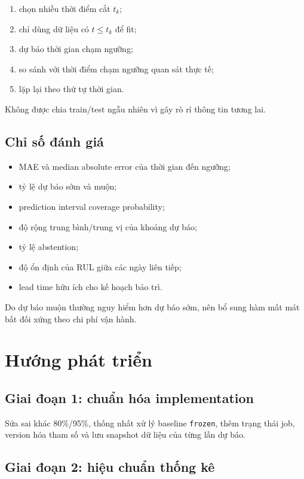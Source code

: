 \documentclass[12pt,a4paper]{article}
\newcommand{\code}[1]{\texttt{#1}}
\begin{document}
\begin{enumerate}
  \item chọn nhiều thời điểm cắt $t_k$;
  \item chỉ dùng dữ liệu có $t\le t_k$ để fit;
  \item dự báo thời gian chạm ngưỡng;
  \item so sánh với thời điểm chạm ngưỡng quan sát thực tế;
  \item lặp lại theo thứ tự thời gian.
\end{enumerate}

Không được chia train/test ngẫu nhiên vì gây rò rỉ thông tin tương lai.

\subsection{Chỉ số đánh giá}

\begin{itemize}
  \item MAE và median absolute error của thời gian đến ngưỡng;
  \item tỷ lệ dự báo sớm và muộn;
  \item prediction interval coverage probability;
  \item độ rộng trung bình/trung vị của khoảng dự báo;
  \item tỷ lệ abstention;
  \item độ ổn định của RUL giữa các ngày liên tiếp;
  \item lead time hữu ích cho kế hoạch bảo trì.
\end{itemize}

Do dự báo muộn thường nguy hiểm hơn dự báo sớm, nên bổ sung hàm mất mát bất đối xứng theo chi phí vận hành.

\section{Hướng phát triển}

\subsection{Giai đoạn 1: chuẩn hóa implementation}

Sửa sai khác 80\%/95\%, thống nhất xử lý baseline \code{frozen}, thêm trạng thái job, version hóa tham số và lưu snapshot dữ liệu của từng lần dự báo.

\subsection{Giai đoạn 2: hiệu chuẩn thống kê}
\end{document}
